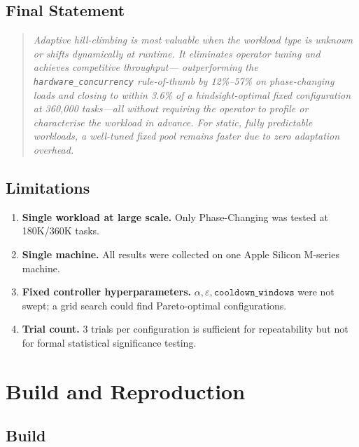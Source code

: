 \documentclass[12pt,a4paper]{article}
\begin{document}
\subsection{Final Statement}

\begin{quote}
\itshape
Adaptive hill-climbing is most valuable when the workload type is unknown
or shifts dynamically at runtime.
It eliminates operator tuning and achieves competitive throughput---
outperforming the \texttt{hardware\_concurrency} rule-of-thumb by
12\%--57\% on phase-changing loads and closing to within 3.6\% of a
hindsight-optimal fixed configuration at 360,000 tasks---all without
requiring the operator to profile or characterise the workload in advance.
For static, fully predictable workloads, a well-tuned fixed pool remains
faster due to zero adaptation overhead.
\end{quote}

\subsection{Limitations}

\begin{enumerate}
  \item \textbf{Single workload at large scale.}
        Only Phase-Changing was tested at 180K/360K tasks.
  \item \textbf{Single machine.}
        All results were collected on one Apple Silicon M-series machine.
  \item \textbf{Fixed controller hyperparameters.}
        $\alpha, \varepsilon, \texttt{cooldown\_windows}$ were not swept;
        a grid search could find Pareto-optimal configurations.
  \item \textbf{Trial count.}
        3 trials per configuration is sufficient for repeatability but not
        for formal statistical significance testing.
\end{enumerate}

\section{Build and Reproduction}

\subsection{Build}
\end{document}
